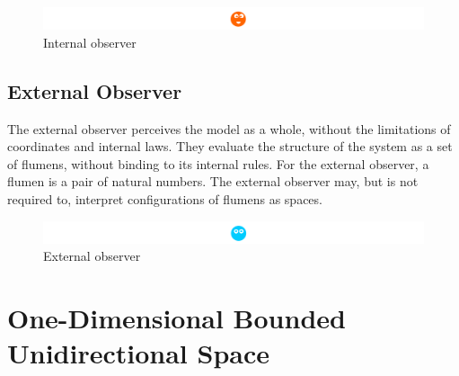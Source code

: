 \documentclass[final]{article}
\begin{document}
            \begin{figure}[H]
                \centering
                \includegraphics[width=\textwidth]{./internal-observer.png}
                \caption{Internal observer}
                \label{fig:image}
            \end{figure}


        \subsection{External Observer}

            The external observer perceives the model as a whole, without the 
            limitations of coordinates and internal laws. They evaluate the 
            structure of the system as a set of flumens, without binding to its 
            internal rules. For the external observer, a flumen is a pair of 
            natural numbers. The external observer may, but is not required to, 
            interpret configurations of flumens as spaces.

            \begin{figure}[H]
                \centering
                \includegraphics[width=\textwidth]{./external-observer.png}
                \caption{External observer}
                \label{fig:image}
            \end{figure}

    \section{One-Dimensional Bounded Unidirectional Space}
\end{document}
